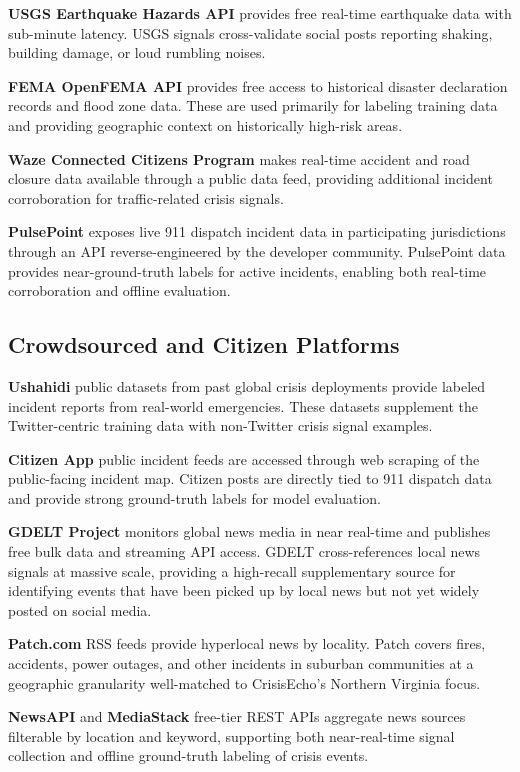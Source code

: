 \documentclass[conference]{IEEEtran}
\begin{document}
\textbf{USGS Earthquake Hazards API} provides free real-time earthquake data
with sub-minute latency. USGS signals cross-validate social posts reporting
shaking, building damage, or loud rumbling noises.

\textbf{FEMA OpenFEMA API} provides free access to historical disaster
declaration records and flood zone data. These are used primarily for labeling
training data and providing geographic context on historically high-risk areas.

\textbf{Waze Connected Citizens Program} makes real-time accident and road
closure data available through a public data feed, providing additional incident
corroboration for traffic-related crisis signals.

\textbf{PulsePoint} exposes live 911 dispatch incident data in participating
jurisdictions through an API reverse-engineered by the developer community.
PulsePoint data provides near-ground-truth labels for active incidents,
enabling both real-time corroboration and offline evaluation.

\subsection{Crowdsourced and Citizen Platforms}

\textbf{Ushahidi} public datasets from past global crisis deployments provide
labeled incident reports from real-world emergencies. These datasets supplement
the Twitter-centric training data with non-Twitter crisis signal examples.

\textbf{Citizen App} public incident feeds are accessed through web scraping
of the public-facing incident map. Citizen posts are directly tied to 911
dispatch data and provide strong ground-truth labels for model evaluation.

\textbf{GDELT Project} monitors global news media in near real-time and
publishes free bulk data and streaming API access. GDELT cross-references
local news signals at massive scale, providing a high-recall supplementary
source for identifying events that have been picked up by local news but
not yet widely posted on social media.

\textbf{Patch.com} RSS feeds provide hyperlocal news by locality. Patch covers
fires, accidents, power outages, and other incidents in suburban communities
at a geographic granularity well-matched to CrisisEcho's Northern Virginia focus.

\textbf{NewsAPI} and \textbf{MediaStack} free-tier REST APIs aggregate news
sources filterable by location and keyword, supporting both near-real-time
signal collection and offline ground-truth labeling of crisis events.
\end{document}
